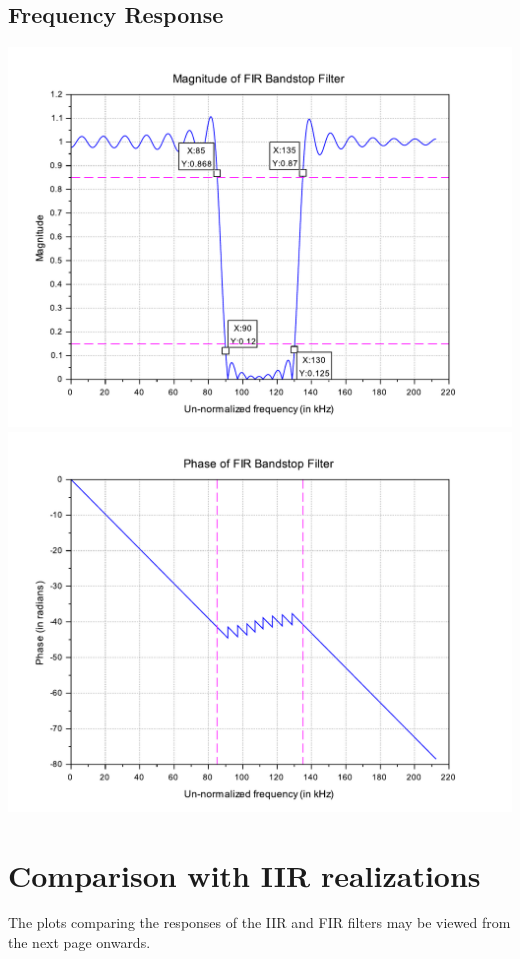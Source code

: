 \documentclass[12pt]{article}
\begin{document}
\subsection{Frequency Response}
\begin{center}
    \includegraphics[scale=0.6]{mag_bs.pdf}
    \includegraphics[scale=0.6]{phase_bs.pdf}
\end{center}

\section{Comparison with IIR realizations}
The plots comparing the responses of the IIR and FIR filters may be viewed from  the next page onwards.
\end{document}
